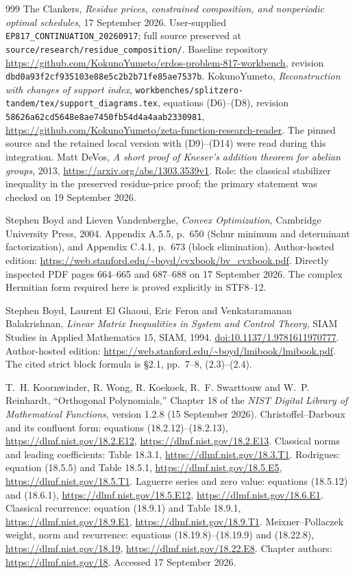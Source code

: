 \begin{thebibliography}{999}
The Clankers, \emph{Residue prices, constrained composition, and nonperiodic
optimal schedules}, 17 September 2026.  User-supplied
\texttt{EP817\_CONTINUATION\_20260917}; full source preserved at
\texttt{source/research/residue\_composition/}.
Baseline repository
\url{https://github.com/KokunoYumeto/erdos-problem-817-workbench},
revision \texttt{dbd0a93f2cf935103e88e5c2b2b71fe85ae7537b}.
KokunoYumeto, \emph{Reconstruction with changes of support index},
\texttt{workbenches/splitzero-tandem/tex/support\_diagrams.tex},
equations (D6)--(D8), revision
\texttt{58626a62cd5648e8ae7450fb54d4a4aab2330981},
\url{https://github.com/KokunoYumeto/zeta-function-research-reader}.
The pinned source and the retained local version with (D9)--(D14) were
read during this integration.
Matt DeVos, \emph{A short proof of Kneser's addition theorem for abelian
groups}, 2013, \url{https://arxiv.org/abs/1303.3539v1}.
Role: the classical stabilizer inequality in the preserved residue-price
proof; the primary statement was checked on 19 September 2026.

Stephen Boyd and Lieven Vandenberghe,
\emph{Convex Optimization}, Cambridge University Press, 2004.
Appendix A.5.5, p.~650 (Schur minimum and determinant factorization),
and Appendix C.4.1, p.~673 (block elimination).
Author-hosted edition: \url{https://web.stanford.edu/~boyd/cvxbook/bv_cvxbook.pdf}.
Directly inspected PDF pages 664--665 and 687--688 on 17 September 2026.
The complex Hermitian form required here is proved explicitly in STF8--12.


Stephen Boyd, Laurent El Ghaoui, Eric Feron and Venkataramanan Balakrishnan,
\emph{Linear Matrix Inequalities in System and Control Theory},
SIAM Studies in Applied Mathematics 15, SIAM, 1994.
\href{https://doi.org/10.1137/1.9781611970777}{doi:10.1137/1.9781611970777}.
Author-hosted edition: \url{https://web.stanford.edu/~boyd/lmibook/lmibook.pdf}.
The cited strict block formula is \S2.1, pp.~7--8, (2.3)--(2.4).


T.~H. Koornwinder, R. Wong, R. Koekoek, R.~F. Swarttouw and
W.~P. Reinhardt,
``Orthogonal Polynomials,'' Chapter 18 of the
\emph{NIST Digital Library of Mathematical Functions},
version 1.2.8 (15 September 2026).
Christoffel--Darboux and its confluent form: equations (18.2.12)--(18.2.13),
\url{https://dlmf.nist.gov/18.2.E12},
\url{https://dlmf.nist.gov/18.2.E13}.
Classical norms and leading coefficients: Table 18.3.1,
\url{https://dlmf.nist.gov/18.3.T1}.
Rodrigues: equation (18.5.5) and Table 18.5.1,
\url{https://dlmf.nist.gov/18.5.E5},
\url{https://dlmf.nist.gov/18.5.T1}.
Laguerre series and zero value: equations (18.5.12) and (18.6.1),
\url{https://dlmf.nist.gov/18.5.E12},
\url{https://dlmf.nist.gov/18.6.E1}.
Classical recurrence: equation (18.9.1) and Table 18.9.1,
\url{https://dlmf.nist.gov/18.9.E1},
\url{https://dlmf.nist.gov/18.9.T1}.
Meixner--Pollaczek weight, norm and recurrence:
equations (18.19.8)--(18.19.9) and (18.22.8),
\url{https://dlmf.nist.gov/18.19},
\url{https://dlmf.nist.gov/18.22.E8}.
Chapter authors: \url{https://dlmf.nist.gov/18}.
Accessed 17 September 2026.



\end{thebibliography}

